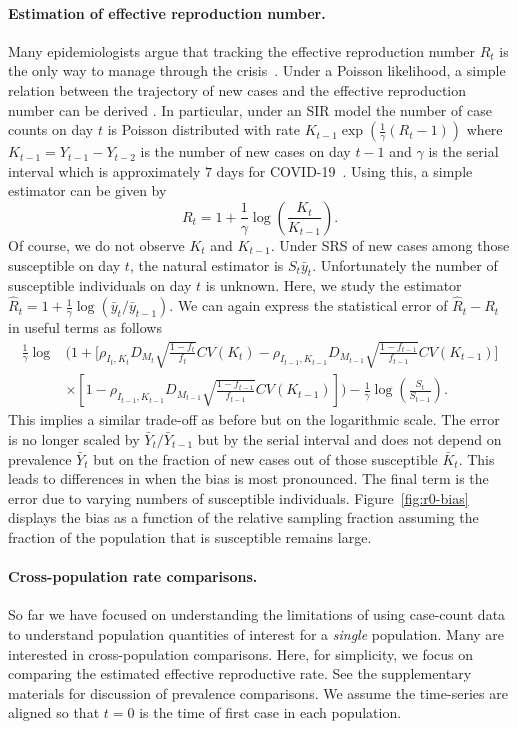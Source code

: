 \documentclass[12pt]{article}
\begin{document}
\paragraph*{Estimation of effective reproduction number.}
Many epidemiologists argue that tracking the effective reproduction number $R_t$ is the only way to manage through the crisis~\cite{Gabriel2020}.  Under a Poisson likelihood, a simple relation between the trajectory of new cases and the effective reproduction number can be derived \cite{Bettencourt2008}.  In particular, under an SIR model the number of case counts on day $t$ is Poisson distributed with rate $K_{t-1} \exp \left( \frac{1}{\gamma} (R_t - 1) \right)$ where $K_{t-1} = Y_{t-1}-Y_{t-2}$ is the number of new cases on day $t-1$ and $\gamma$ is the serial interval which is approximately $7$ days for COVID-19~\cite{Sanche2020}.  Using this, a simple estimator can be given by
$$
R_t = 1 + \frac{1}{\gamma} \log \left( \frac{K_t}{K_{t-1}} \right).
$$
Of course, we do not observe $K_t$ and $K_{t-1}$.  Under SRS of new cases among those susceptible on day $t$, the natural estimator is $S_t \bar y_t$.  Unfortunately the number of susceptible individuals on day $t$ is unknown.  Here, we study the estimator $\hat R_t = 1 + \frac{1}{\gamma} \log \left( \bar y_t / \bar y_{t-1} \right)$. We can again express the statistical error of $\hat R_t - R_t$ in useful terms as follows
$$
\begin{aligned}
\frac{1}{\gamma}\log &\bigg( 1 + \bigg[ \rho_{I_t,K_t} D_{M_t} \sqrt{\frac{1-f_t}{f_t}} CV (K_t)  -\rho_{I_{t-1},K_{t-1}} D_{M_{t-1}} \sqrt{\frac{1-f_{t-1}}{f_{t-1}}} CV (K_{t-1}) \bigg] \\
&\times \left[ 1 - \rho_{I_{t-1},K_{t-1}} D_{M_{t-1}} \sqrt{\frac{1-f_{t-1}}{f_{t-1}}} CV (K_{t-1}) \right] \bigg) - \frac{1}{\gamma} \log \left( \frac{S_t}{S_{t-1}} \right).
\end{aligned}
$$
This implies a similar trade-off as before but on the logarithmic scale.  The error is no longer scaled by $\bar Y_t/\bar Y_{t-1}$ but by the serial interval and does not depend on prevalence $\bar Y_t$ but on the fraction of new cases out of those susceptible $\bar K_t$. This leads to differences in when the bias is most pronounced. The final term is the error due to varying numbers of susceptible individuals.  Figure~\ref{fig:r0-bias} displays the bias as a function of the relative sampling fraction assuming the fraction of the population that is susceptible remains large.

\paragraph*{Cross-population rate comparisons.}
So far we have focused on understanding the limitations of using case-count data to understand population quantities of interest for a \emph{single} population.  Many are interested in cross-population comparisons.  Here, for simplicity, we focus on comparing the estimated effective reproductive rate. See the supplementary materials for discussion of prevalence comparisons.  We assume the time-series are aligned so that $t=0$ is the time of first case in each population.
\end{document}
